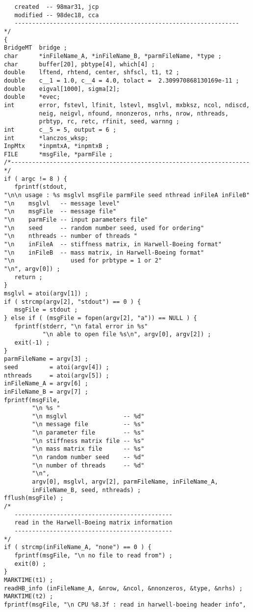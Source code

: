 \begin{verbatim}
   created  -- 98mar31, jcp
   modified -- 98dec18, cca
   ----------------------------------------------------------------
*/
{
BridgeMT  bridge ;
char      *inFileName_A, *inFileName_B, *parmFileName, *type ;
char      buffer[20], pbtype[4], which[4] ;
double    lftend, rhtend, center, shfscl, t1, t2 ;
double    c__1 = 1.0, c__4 = 4.0, tolact =  2.309970868130169e-11 ;
double    eigval[1000], sigma[2];
double    *evec;
int       error, fstevl, lfinit, lstevl, msglvl, mxbksz, ncol, ndiscd,
          neig, neigvl, nfound, nnonzeros, nrhs, nrow, nthreads,
          prbtyp, rc, retc, rfinit, seed, warnng ;
int       c__5 = 5, output = 6 ;
int       *lanczos_wksp;
InpMtx    *inpmtxA, *inpmtxB ;
FILE      *msgFile, *parmFile ;
/*--------------------------------------------------------------------*/
if ( argc != 8 ) {
   fprintf(stdout, 
"\n\n usage : %s msglvl msgFile parmFile seed nthread inFileA inFileB"
"\n    msglvl   -- message level"
"\n    msgFile  -- message file"
"\n    parmFile -- input parameters file"
"\n    seed     -- random number seed, used for ordering"
"\n    nthreads -- number of threads "
"\n    inFileA  -- stiffness matrix, in Harwell-Boeing format"
"\n    inFileB  -- mass matrix, in Harwell-Boeing format"
"\n                used for prbtype = 1 or 2"
"\n", argv[0]) ;
   return ;
}
msglvl = atoi(argv[1]) ;
if ( strcmp(argv[2], "stdout") == 0 ) {
   msgFile = stdout ;
} else if ( (msgFile = fopen(argv[2], "a")) == NULL ) {
   fprintf(stderr, "\n fatal error in %s"
           "\n able to open file %s\n", argv[0], argv[2]) ;
   exit(-1) ;
}
parmFileName = argv[3] ;
seed         = atoi(argv[4]) ;
nthreads     = atoi(argv[5]) ;
inFileName_A = argv[6] ;
inFileName_B = argv[7] ;
fprintf(msgFile, 
        "\n %s "
        "\n msglvl                -- %d" 
        "\n message file          -- %s" 
        "\n parameter file        -- %s" 
        "\n stiffness matrix file -- %s" 
        "\n mass matrix file      -- %s" 
        "\n random number seed    -- %d"
        "\n number of threads     -- %d"
        "\n",
        argv[0], msglvl, argv[2], parmFileName, inFileName_A, 
        inFileName_B, seed, nthreads) ;
fflush(msgFile) ;
/*
   ---------------------------------------------
   read in the Harwell-Boeing matrix information
   ---------------------------------------------
*/
if ( strcmp(inFileName_A, "none") == 0 ) {
   fprintf(msgFile, "\n no file to read from") ;
   exit(0) ;
}
MARKTIME(t1) ;
readHB_info (inFileName_A, &nrow, &ncol, &nnonzeros, &type, &nrhs) ;
MARKTIME(t2) ;
fprintf(msgFile, "\n CPU %8.3f : read in harwell-boeing header info",

\end{verbatim}
